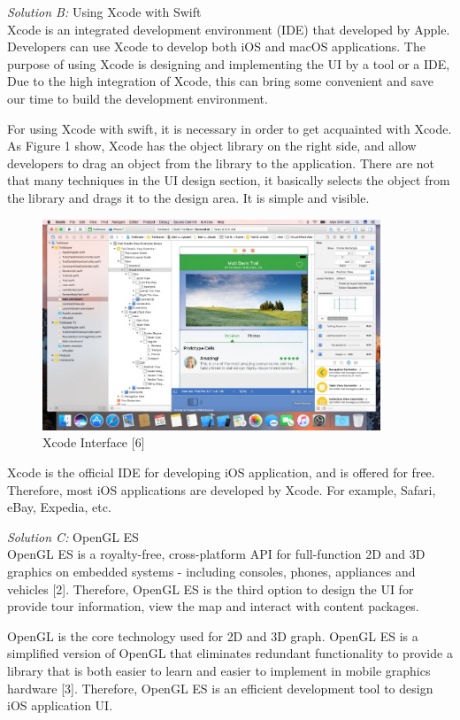 \documentclass[letterpaper, 10pt,titlepage]{article}
\begin{document}
\textit{Solution B:} Using Xcode with Swift\\
Xcode is an integrated development environment (IDE) that developed by Apple. Developers can use Xcode to develop both iOS and macOS applications. The purpose of using Xcode is designing and implementing the UI by a tool or a IDE, Due to the high integration of Xcode, this can bring some convenient and save our time to build the development environment.  


For using Xcode with swift, it is necessary in order to get acquainted with Xcode. As Figure 1 show, Xcode has the object library on the right side, and allow developers to drag an object from the library to the application. There are not that many techniques in the UI design section, it basically selects the object from the library and drags it to the design area. It is simple and visible.

\begin{figure}[ht]
    \centering
    \includegraphics[width=0.9\textwidth]{j1}
    \caption{Xcode Interface [6]}
    \label{jiawei1}
\end{figure}

Xcode is the official IDE for developing iOS application, and is offered for free. Therefore, most iOS applications are developed by Xcode. For example, Safari, eBay, Expedia, etc.


\textit{Solution C:} OpenGL ES\\
OpenGL ES is a royalty-free, cross-platform API for full-function 2D and 3D graphics on embedded systems - including consoles, phones, appliances and vehicles [2]. Therefore, OpenGL ES is the third option to design the UI for provide tour information, view the map and interact with content packages. 


OpenGL is the core technology used for 2D and 3D graph. OpenGL ES is a simplified version of OpenGL that eliminates redundant functionality to provide a library that is both easier to learn and easier to implement in mobile graphics hardware [3]. Therefore, OpenGL ES is an efficient development tool to design iOS application UI. 
\end{document}
